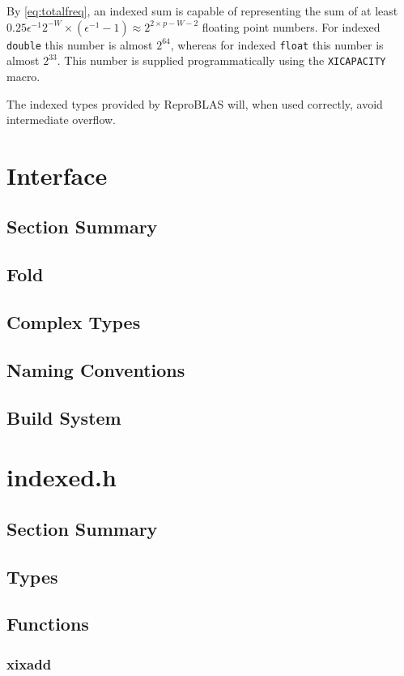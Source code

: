 \documentclass[12pt]{article}
\theoremstyle{definition}
\numberwithin{equation}{section}
\numberwithin{figure}{section}
\begin{document}
    By \eqref{eq:totalfreq}, an indexed sum is capable of representing the sum of at least $0.25\epsilon^{-1}2^{-W} \times (\epsilon^{-1} - 1) \approx 2^{2 \times p - W - 2}$ floating point numbers. For indexed \texttt{double} this number is almost $2^{64}$, whereas for indexed \texttt{float} this number is almost $2^{33}$. This number is supplied programmatically using the \texttt{XICAPACITY} macro.

    The indexed types provided by ReproBLAS will, when used correctly, avoid intermediate overflow.

\section{Interface}
  \subsection{Section Summary}
  \subsection{Fold}
  \subsection{Complex Types}
  \subsection{Naming Conventions}
  \subsection{Build System}
\section{indexed.h}
  \subsection{Section Summary}
  \subsection{Types}
  \subsection{Functions}
    \subsubsection{xixadd}
\end{document}
